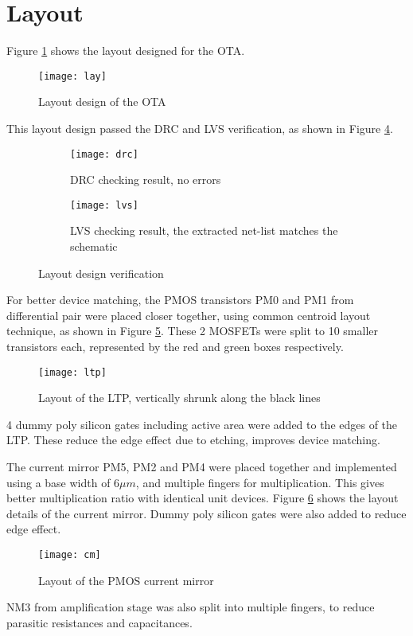 \section{Layout}

Figure \ref{fig:lay} shows the layout designed for the OTA.

\begin{figure}[!htb]
	\centering
	\texttt{[image: lay]}
	\caption{Layout design of the OTA}
	\label{fig:lay}
\end{figure}

This layout design passed the DRC and LVS verification, as shown in Figure \ref{fig:vfy}.

\begin{figure}[!htb]
	\centering
	\begin{subfigure}[b]{0.5\textwidth}
		\texttt{[image: drc]}
		\caption{DRC checking result, no errors}
		\label{fig:drc}
	\end{subfigure}
	\begin{subfigure}[b]{0.4\textwidth}
		\texttt{[image: lvs]}
		\caption{LVS checking result, the extracted net-list matches the schematic}
		\label{fig:lvs}
	\end{subfigure}
	\caption{Layout design verification}
	\label{fig:vfy}
\end{figure}

For better device matching, the PMOS transistors PM0 and PM1 from differential pair were placed closer together, using common centroid layout technique, as shown in Figure \ref{fig:ltp}. These 2 MOSFETs were split to 10 smaller transistors each, represented by the red and green boxes respectively.

\begin{figure}[!htb]
	\centering
	\texttt{[image: ltp]}
	\caption{Layout of the LTP, vertically shrunk along the black lines}
	\label{fig:ltp}
\end{figure}

4 dummy poly silicon gates including active area were added to the edges of the LTP. These reduce the edge effect due to etching, improves device matching.

The current mirror PM5, PM2 and PM4 were placed together and implemented using a base width of $6\mu m$, and multiple fingers for multiplication. This gives better multiplication ratio with identical unit devices. Figure \ref{fig:cm} shows the layout details of the current mirror. Dummy poly silicon gates were also added to reduce edge effect.

\begin{figure}[!htb]
	\centering
	\texttt{[image: cm]}
	\caption{Layout of the PMOS current mirror}
	\label{fig:cm}
\end{figure}

NM3 from amplification stage was also split into multiple fingers, to reduce parasitic resistances and capacitances.
